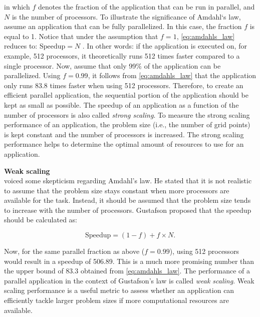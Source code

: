 \noindent in which $f$ denotes the fraction of the application that can be run in parallel, and $N$ is the number of processors. To illustrate the significance of Amdahl`s law, assume an application that can be fully parallelized. In this case, the fraction $f$ is equal to 1. Notice that under the assumption that $f=1$, \autoref{eq:amdahls_law} reduces to: $\text{Speedup} = N$ . In other words: if the application is executed on, for example, 512 processors, it theoretically runs 512 times faster compared to a single processor. Now, assume that only 99\% of the application can be parallelized. Using $f=0.99$, it follows from \autoref{eq:amdahls_law} that the application only runs 83.8 times faster when using 512 processors. Therefore, to create an efficient parallel application, the sequential portion of the application should be kept as small as possible. The speedup of an application as a function of the number of processors is also called \emph{strong scaling}. To measure the strong scaling performance of an application, the problem size (i.e., the number of grid points) is kept constant and the number of processors is increased. The strong scaling performance helps to determine the optimal amount of resources to use for an application.

\textbf{Weak scaling} \\
\cite{gustafsonReevaluatingAmdahlLaw1988} voiced some skepticism regarding Amdahl's law. He stated that it is not realistic to assume that the problem size stays constant when more processors are available for the task. Instead, it should be assumed that the problem size tends to increase with the number of processors. Gustafson proposed that the speedup should be calculated as:

\begin{equation}
    \text{Speedup} = (1-f) + f \times N.
    \label{eq:gustafsons_law}
\end{equation}

\noindent Now, for the same parallel fraction as above ($f=0.99$), using 512 processors would result in a speedup of 506.89. This is a much more promising number than the upper bound of 83.3 obtained from \autoref{eq:amdahls_law}. The performance of a parallel application in the context of Gustafson's law is called \emph{weak scaling}. Weak scaling performance is a useful metric to assess whether an application can efficiently tackle larger problem sizes if more computational resources are available.

